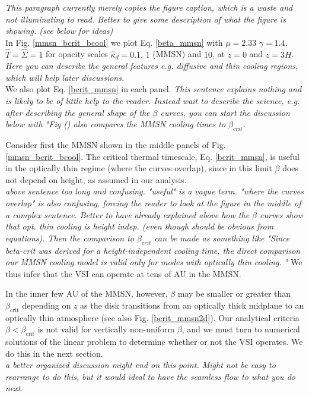 \emph{This paragraph currently merely copies the figure caption, which is a waste and not illuminating to read.  Better to give some description of what the figure is showing. (see below for ideas)}\\
In Fig. \ref{mmsn_bcrit_bcool} we plot Eq. \ref{beta_mmsn}  with $\mu
=2.33$ $\gamma=1.4$, $\hat{T}=\hat{\Sigma}=1$ for opacity scales
$\hat{\kappa}_d=0.1, \,1 $ (MMSN) and $10$, at $z=0$ and $z=3H$. \\
\emph{Here you can describe the general features e.g. diffusive and thin cooling regions, which will help later discussions.}\\
We also plot Eq. \ref{bcrit_mmsn} in each panel.  \emph{This sentence explains nothing and is likely to be of little help to the reader.  Instead wait to describe the science, e.g. after describing the general shape of the $\beta$ curves,  you can start the discussion below with "Fig () also compares the MMSN cooling times to $\beta_{crit}$.}

Consider first the MMSN shown in the middle panels of 
Fig. \ref{mmsn_bcrit_bcool}. The critical thermal timescale,
Eq. \ref{bcrit_mmsn}, is useful in the optically thin regime (where the
curves overlap), since in this limit $\beta$ does not depend on
height, as assumed in our analysis. \\
\emph{above sentence too long and confusing.  "useful" is a vague term.  
"where the curves overlap" is also confusing, forcing the reader to look at the figure in the middle of a complex sentence.  Better to have already explained above how the $\beta$ curves show that opt. thin cooling is height indep. (even though should be obvious from equations).  Then the comparison to $\beta_{crit}$ can be made as something like "Since beta-crit was derived for a height-independent cooling time,  the direct comparison our MMSN cooling model is valid only for modes with optically thin cooling. "} 
We thus infer that the VSI can
operate at tens of AU in the MMSN.  

In the inner few AU of the MMSN, however, $\beta$ 
may be smaller or greater than $\beta_\mathrm{crit}$ depending on
$z$ as the disk transitions from an optically thick midplane to an
optically thin atmosphere (see also Fig. \ref{bcrit_mmsn2d}). 
Our analytical criteria $\beta < \beta_\mathrm{crit}$ is not valid for
vertically non-uniform $\beta$, and we must turn to numerical
solutions of the linear problem to determine whether or not the VSI
operates. We do this in the next section.    \\
\emph{a better organized discussion might end on this point.  Might not be easy to rearrange to do this, but it would ideal to have the seamless flow to what you do next.}
 
